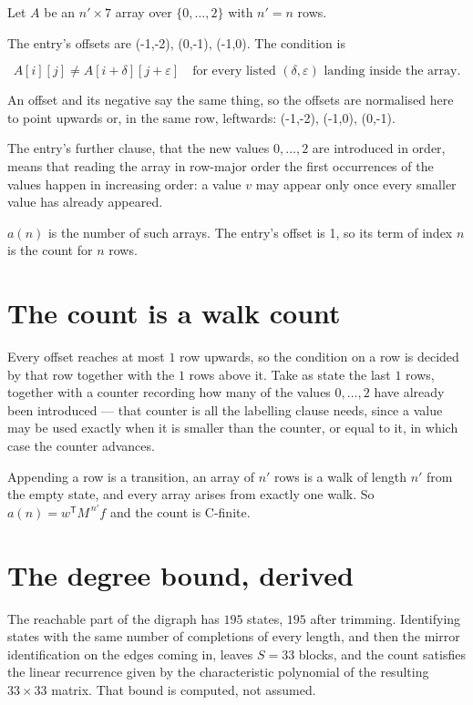 \documentclass[11pt]{article}
\theoremstyle{definition}
\begin{document}
Let $A$ be an $n' \times 7$ array over $\{0,\dots,2\}$ with $n' = n$ rows.

The entry's offsets are (-1,-2), (0,-1), (-1,0). The condition is

\[A[i][j] \ne A[i{+}\delta][j{+}\varepsilon]\quad\text{for every listed }(\delta,\varepsilon)\text{ landing inside the array.}\]

An offset and its negative say the same thing, so the offsets are normalised here to point upwards or, in the same row, leftwards: (-1,-2), (-1,0), (0,-1).

The entry's further clause, that the new values $0,\dots,2$ are introduced in order, means that reading the array in row-major order the first occurrences of the values happen in increasing order: a value $v$ may appear only once every smaller value has already appeared.

$a(n)$ is the number of such arrays. The entry's offset is 1, so its term of index $n$ is the count for $n$ rows.

\section{The count is a walk count}

Every offset reaches at most $1$ row upwards, so the condition on a row is decided by that row together with the $1$ rows above it. Take as state the last $1$ rows, together with a counter recording how many of the values $0,\dots,2$ have already been introduced --- that counter is all the labelling clause needs, since a value may be used exactly when it is smaller than the counter, or equal to it, in which case the counter advances.

Appending a row is a transition, an array of $n'$ rows is a walk of length $n'$ from the empty state, and every array arises from exactly one walk. So $a(n) = w^{\mathsf T}M^{\,n'}f$ and the count is C-finite.

\section{The degree bound, derived}

The reachable part of the digraph has $195$ states, $195$ after trimming. Identifying states with the same number of completions of every length, and then the mirror identification on the edges coming in, leaves $S = 33$ blocks, and the count satisfies the linear recurrence given by the characteristic polynomial of the resulting $33\times33$ matrix. That bound is computed, not assumed.
\end{document}
